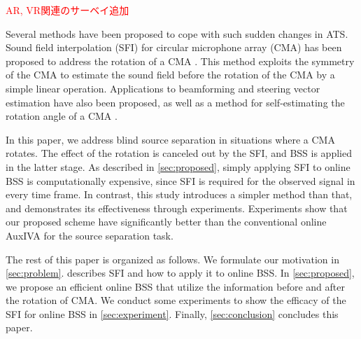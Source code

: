 \documentclass[sip,biber]{now-journal}
\newcommand{\todo}[1]{\textcolor{red}{#1}}
\begin{document}
\todo{AR, VR関連のサーベイ追加}

Several methods have been proposed to cope with such sudden changes in ATS.
Sound field interpolation (SFI) for circular microphone array (CMA) has been proposed to address the rotation of a CMA \cite{Wakabayashi:2023:ASLP}.
This method exploits the symmetry of the CMA to estimate the sound field before the rotation of the CMA by a simple linear operation.
Applications to beamforming \cite{Wakabayashi:2021:ICASSP} and steering vector estimation \cite{Wakabayashi:2021:ASJ:A} have also been proposed,
as well as a method for self-estimating the rotation angle of a CMA \cite{Lian:2021:APSIPA}.

In this paper, we address blind source separation in situations where a CMA rotates.
The effect of the rotation is canceled out by the SFI, and BSS is applied in the latter stage.
As described in \cref{sec:proposed}, simply applying SFI to online BSS is computationally expensive, since SFI is required for the observed signal in every time frame.
In contrast, this study introduces a simpler method than that, and demonstrates its effectiveness through experiments.
Experiments show that our proposed scheme have significantly better than the conventional online AuxIVA for the source separation task.

The rest of this paper is organized as follows.
We formulate our motivation in \cref{sec:problem}.
 describes SFI and how to apply it to online BSS.
In \cref{sec:proposed}, we propose an efficient online BSS that utilize the information before and after the rotation of CMA.
We conduct some experiments to show the efficacy of the SFI for online BSS in \cref{sec:experiment}.
Finally, \cref{sec:conclusion} concludes this paper.
\end{document}
